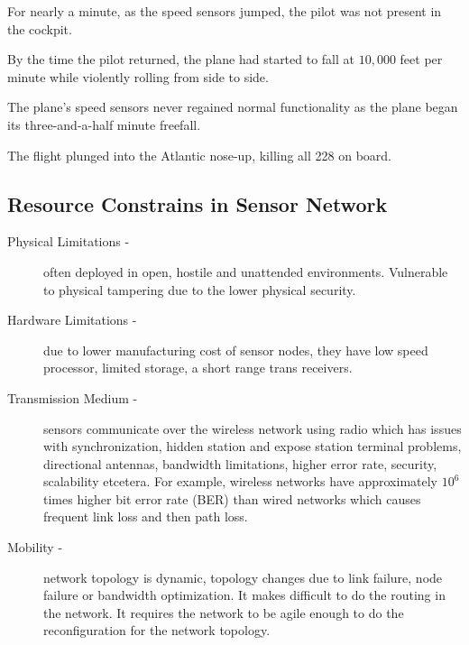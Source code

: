 \documentclass[%
  slidesonly,%
  semlayer%
  ]{seminar}                                  %
\begin{document}
\begin{slide}
      For nearly a minute, as the speed sensors jumped, the pilot was not present in the cockpit. 
      
      By the time the pilot returned, the plane had started to fall at $10,000$ feet per minute while violently rolling from side to side.
      
      The plane's speed sensors never regained normal functionality as the plane began its three-and-a-half minute freefall.
      
      The flight plunged into the Atlantic nose-up, killing all 228 on board.
      
      \clearpage

  \subsection*{Resource Constrains in Sensor Network}
    \begin{description}
      \item[Physical Limitations -] often deployed in open, hostile and unattended environments. Vulnerable to physical tampering due to the lower physical security.

      \item[Hardware Limitations -] due to lower manufacturing cost of sensor nodes, they have low speed processor, limited storage, a short range trans receivers.

      \item[Transmission Medium -] sensors communicate over the wireless network using radio which has issues with synchronization, hidden station and expose station terminal problems, directional antennas, bandwidth limitations, higher error rate, security, scalability etcetera.
      For example, wireless networks have approximately $10^6$ times higher bit error rate (BER) than wired networks which causes frequent link loss and then path loss.

      \item[Mobility -] network topology is dynamic, topology changes due to link failure, node failure or bandwidth optimization.
      It makes difficult to do the routing in the network.
      It requires the network to be agile enough to do the reconfiguration for the network topology. 
    \end{description}

    \clearpage


\end{slide}
\end{document}
